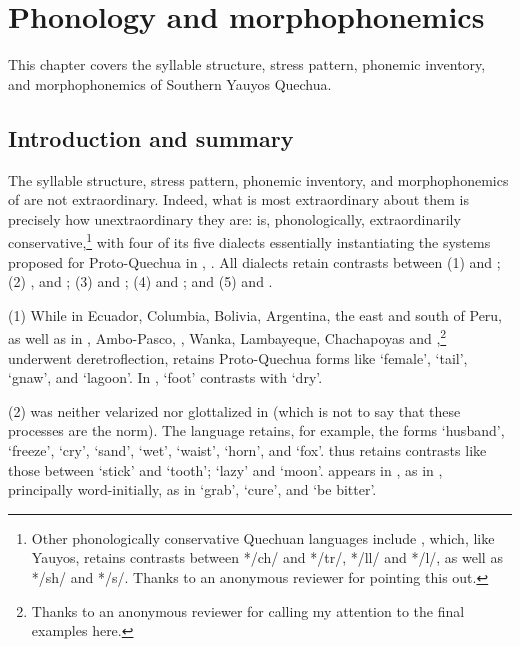 \chapter{Phonology and morphophonemics}\label{ch:Phono and morpho}
This chapter covers the syllable structure, stress pattern, phonemic inventory, and morphophonemics of Southern Yauyos Quechua. 

\section{Introduction and summary}\label{sec:phon intro}
The syllable structure, stress pattern, phonemic inventory, and morphophonemics of \SYQ{} are not extraordinary. Indeed, what is most extraordinary about them is precisely how unextraordinary they are: \SYQ{} is, phonologically, extraordinarily conservative,\footnote{Other phonologically conservative Quechuan languages include , which, like Yauyos, retains contrasts between */ch/ and */tr/, */ll/ and */l/, as well as */sh/ and */s/. Thanks to an anonymous reviewer for pointing this out.} with four of its five dialects essentially instantiating the systems proposed for Proto-Quechua in \citet{Landerman91}, \citet[ch.4]{CerroP87}. All \SYQ{} dialects retain contrasts between (1) \textipa{[č]} and \textipa{[ĉ]}; (2) \textipa{[k]}, \textipa{[q]} and \textipa{[h]}; (3) \textipa{[l]} and \textipa{[λ]}; (4) \textipa{[n]} and \textipa{[ň]}; and (5) \textipa{[s]} and \textipa{[š]}.

(1) While in Ecuador, Columbia, Bolivia, Argentina, the east and south of Peru, as well as in , Ambo-Pasco, , Wanka, Lambayeque, Chachapoyas and ,\footnote{Thanks to an anonymous reviewer for calling my attention to the final examples here.}  underwent deretroflection, \SYQ{} retains Proto-Quechua forms like  ‘female’,  ‘tail’,  ‘gnaw’, and  ‘lagoon’. In \SYQ{},  ‘foot’ contrasts with  ‘dry’.

(2)  was neither velarized nor glottalized in \SYQ{} (which is not to say that these processes are the norm). The language retains, for example, the \PQ{} forms  ‘husband’,  ‘freeze’,  ‘cry’,  ‘sand’,  ‘wet’,  ‘waist’,  ‘horn’, and  ‘fox’. \SYQ{} thus retains contrasts like those between  ‘stick’ and  ‘tooth’;  ‘lazy’ and  ‘moon’.  appears in \SYQ, as in \PQ, principally word-initially, as in  ‘grab’,  ‘cure’, and  ‘be bitter’. 

